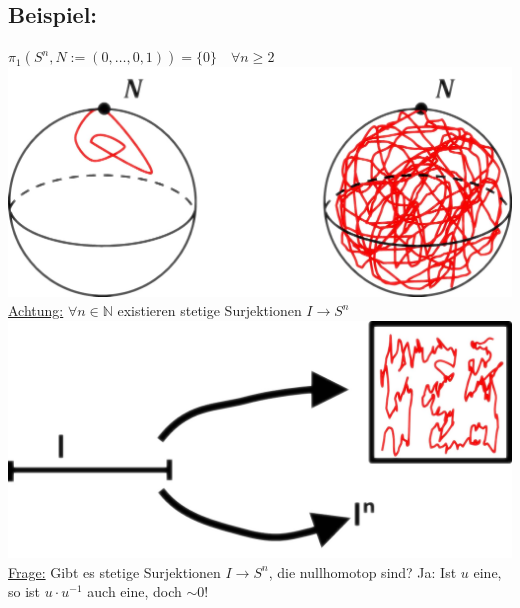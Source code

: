 \documentclass[a4paper,11pt,notitlepage]{report}
\theoremstyle{definition}
\newcommand{\N}{{\ensuremath{\mathbb{N}}}}
\newenvironment{bsp}[1]
{
\setlength{\fboxsep}{10pt}
\subsection*{Beispiel: #1}
\begin{upshape}
}
{
\end{upshape}
}
\begin{document}
\begin{bsp}{}
	$\pi_1\left(S^n, N:= (0,\ldots, 0,1)\right) = \{0\} \quad \forall n \geq 2$
	\newline \includegraphics[scale=0.4]{images/I_S2_surjektiv.png}
	\newline
	\underline{Achtung:} $\forall n \in \N$ existieren stetige Surjektionen $I \rightarrow S^n$
	\newline \includegraphics[scale=0.4]{images/I_I2_surjektiv.png}
	\newline
	\underline{Frage:} Gibt es stetige Surjektionen $I \rightarrow S^n$, die nullhomotop sind? Ja: Ist $u$ eine, so ist $u \cdot u^{-1}$ auch eine, doch $\sim 0$!
\end{bsp}
\end{document}

